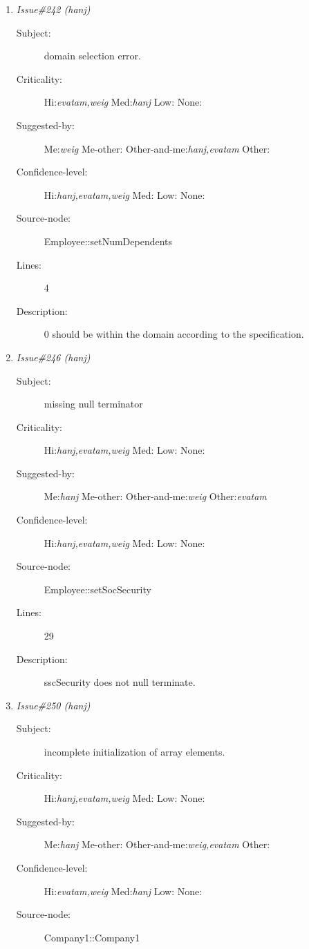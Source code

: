 \begin{enumerate}
\begin{description}
\item [Lines:] 11

\item [Description:] Impossible logical evaluation
\end{description}
\item {\it Issue\#242 (hanj)}
\begin{description}
\item [Subject:] domain selection error.
\item [Criticality:] Hi:{\it evatam,weig} Med:{\it hanj} Low:{\it } None:{\it }
\item [Suggested-by:] Me:{\it weig} Me-other:{\it } Other-and-me:{\it hanj,evatam} Other:{\it }
\item [Confidence-level:] Hi:{\it hanj,evatam,weig} Med:{\it } Low:{\it } None:{\it }
\item [Source-node:] Employee::setNumDependents

\item [Lines:] 4

\item [Description:] 0 should be within the domain according to the specification.
\end{description}
\item {\it Issue\#246 (hanj)}
\begin{description}
\item [Subject:] missing null terminator
\item [Criticality:] Hi:{\it hanj,evatam,weig} Med:{\it } Low:{\it } None:{\it }
\item [Suggested-by:] Me:{\it hanj} Me-other:{\it } Other-and-me:{\it weig} Other:{\it evatam}
\item [Confidence-level:] Hi:{\it hanj,evatam,weig} Med:{\it } Low:{\it } None:{\it }
\item [Source-node:] Employee::setSocSecurity

\item [Lines:] 29

\item [Description:] sscSecurity does not null terminate.
\end{description}
\item {\it Issue\#250 (hanj)}
\begin{description}
\item [Subject:] incomplete initialization of array elements.
\item [Criticality:] Hi:{\it hanj,evatam,weig} Med:{\it } Low:{\it } None:{\it }
\item [Suggested-by:] Me:{\it hanj} Me-other:{\it } Other-and-me:{\it weig,evatam} Other:{\it }
\item [Confidence-level:] Hi:{\it evatam,weig} Med:{\it hanj} Low:{\it } None:{\it }
\item [Source-node:] Company1::Company1


\end{description}
\end{enumerate}
